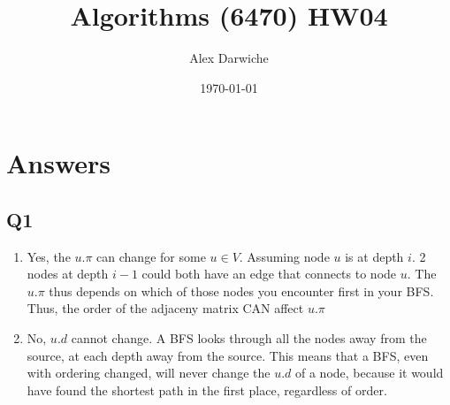 \documentclass{article}
\title{Algorithms (6470) HW04}
\author{Alex Darwiche}
\date{\today}
\begin{document}
\maketitle

\section*{Answers}

\subsection*{Q1}
\begin{enumerate}[label=(\alph*)]
    \item Yes, the $u.\pi$ can change for some $u \in V$. Assuming node $u$ is at depth $i$. 2 nodes at depth $i-1$ could both have an edge that connects to node $u$. The $u.\pi$ thus depends on which of those nodes you encounter first in your BFS. Thus, the order of the adjaceny matrix CAN affect $u.\pi$
    \item No, $u.d$ cannot change. A BFS looks through all the nodes away from the source, at each depth away from the source. This means that a BFS, even with ordering changed, will never change the $u.d$ of a node, because it would have found the shortest path in the first place, regardless of order.
\end{enumerate}

\end{document}
